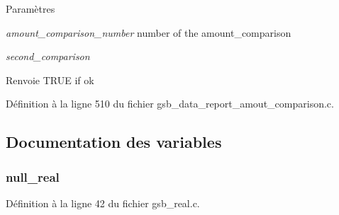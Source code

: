 \begin{DoxyParams}{Paramètres}
\item[{\em amount\_\-comparison\_\-number}]number of the amount\_\-comparison \item[{\em second\_\-comparison}]\end{DoxyParams}
\begin{DoxyReturn}{Renvoie}
TRUE if ok 
\end{DoxyReturn}


Définition à la ligne 510 du fichier gsb\_\-data\_\-report\_\-amout\_\-comparison.c.



\subsection{Documentation des variables}
\subsubsection[{null\_\-real}]{ {\bf null\_\-real}}\label{gsb__data__report__amout__comparison_8c_a26f304bec3fdc0651b9aa8765d4de3c6}


Définition à la ligne 42 du fichier gsb\_\-real.c.

